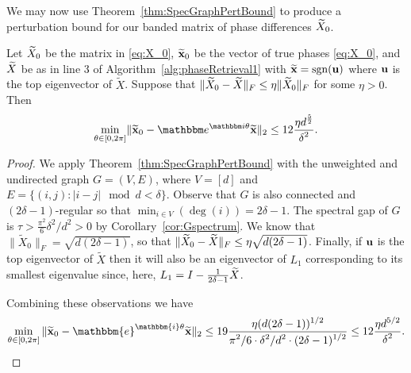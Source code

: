 
We may now use Theorem~\ref{thm:SpecGraphPertBound} to produce a perturbation bound for our banded matrix of phase differences $\widetilde{X}_0$.%

\begin{corollary}
Let $\widetilde{X}_0$ be the matrix in \eqref{eq:X_0}, $\widetilde{\mathbf x}_0$ be the vector of true phases \eqref{eq:X_0}, and $\widetilde{X}$ be as in line 3 of Algorithm~\ref{alg:phaseRetrieval1} with $\widetilde{\mathbf x} = \mathrm{sgn}({\bf u})$ where ${\bf u}$ is the top eigenvector of $\widetilde{X}$. Suppose that 
$\Vert \widetilde{X}_0 - \widetilde{X} \Vert_F \le \eta \Vert \widetilde{X}_0 \Vert_F$ for some $\eta>0$.  Then
\[\mintheta \norm{\tx_0 - \eit \tx}_2 \le 12 \bigfrac{\eta d^\frac{5}{2}}{\delta^{2}}.\]
\label{cor:GenBoundv2}
\end{corollary}

\begin{proof}
 We apply Theorem~\ref{thm:SpecGraphPertBound} with the unweighted and undirected graph $G = (V, E)$, where $V = [d]$ and $E = \{(i, j) : |i - j| \mod d < \delta\}$.  Observe that $G$ is also connected and $(2\delta - 1)$-regular so that $\min_{i \in V}(\deg(i)) = 2\delta - 1$.  The spectral gap of $G$ is $\tau > \frac{\pi^2}{6} \delta^2 / d^2 > 0$ by Corollary~\ref{cor:Gspectrum}.  We know that $\| \widetilde{X}_0 \|_F = \sqrt{d(2\delta - 1)}$, so that $\| \widetilde{X}_0 - \widetilde{X} \|_{F} \le \eta \sqrt{d(2\delta - 1)}$.  Finally, if ${\bf u}$ is the top eigenvector of $\widetilde{X}$ then it will also be an eigenvector of $L_1$ corresponding to its smallest eigenvalue since, here, $L_1 = I - \frac{1}{2 \delta - 1} \widetilde{X} $.

Combining these observations we have \[\min_{\theta\in[0,2\pi]} \Vert \tx_0 - \mathbbm{e}^{\mathbbm{i}\theta} \tx \Vert_2 \le 19 \bigfrac{\eta (d (2 \delta - 1))^{1/2}}{\pi^2 / 6 \cdot \delta^2 / d^2 \cdot (2 \delta - 1)^{1/2}} \le 12 \bigfrac{\eta d^{5/2}}{\delta^2}.\]
\end{proof}
